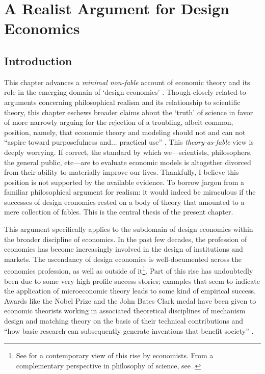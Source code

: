 \chapter{A Realist Argument for Design Economics}\label{ch_fables}

\section{Introduction}

This chapter advances a \textit{minimal non-fable} account of economic theory and its role in the emerging domain of `design economics' \autocite{roth2018}. Though closely related to arguments concerning philosophical realism and its relationship to scientific theory, this chapter eschews broader claims about the `truth' of science in favor of more narrowly arguing for the rejection of a troubling, albeit common, position, namely, that economic theory and modeling should not and can not ``aspire toward purposefulness and... practical use'' \autocite[35]{rubinstein2012}. This \textit{theory-as-fable} view is deeply worrying. If correct, the standard by which we---scientists, philosophers, the general public, etc---are to evaluate economic models is altogether divorced from their ability to materially improve our lives. Thankfully, I believe this position is not supported by the available evidence. To borrow jargon from a familiar philosophical argument for realism: it would indeed be miraculous if the successes of design economics rested on a body of theory that amounted to a mere collection of fables. This is the central thesis of the present chapter.

This argument specifically applies to the subdomain of design economics within the broader discipline of economics. In the past few decades, the profession of economics has become increasingly involved in the design of institutions and markets. The ascendancy of design economics is well-documented across the economics profession, as well as outside of it\footnote{See \autocite{roth2019,spiegler2024} for a contemporary view of this rise by economists. From a complementary perspective in philosophy of science, see \autocite{alexandrova2009,guala2001}.}. Part of this rise has undoubtedly been due to some very high-profile success stories; examples that seem to indicate the application of microeconomic theory leads to some kind of empirical success. Awards like the Nobel Prize and the John Bates Clark medal have been given to economic theorists working in associated theoretical disciplines of mechanism design and matching theory on the basis of their technical contributions and ``how basic research can subsequently generate inventions that benefit society'' \autocite{nobel2020}.


